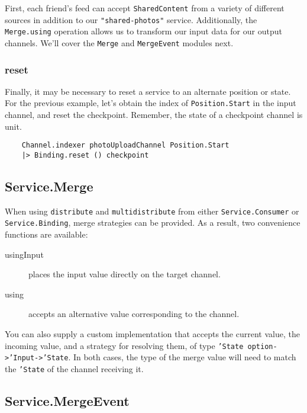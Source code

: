 \documentclass{article}
\begin{document}
First, each friend's feed can accept \texttt{SharedContent} from a variety of different sources in addition to our \texttt{"shared-photos"} service.  Additionally, the \texttt{Merge.using} operation allows us to transform our input data for our output channels.  We'll cover the \texttt{Merge} and \texttt{MergeEvent} modules next.

\subsubsection{reset}

Finally, it may be necessary to reset a service to an alternate position or state.  For the previous example, let's obtain the index of \texttt{Position.Start} in the input channel, and reset the checkpoint.  Remember, the state of a checkpoint channel is unit.

\begin{verbatim}
    Channel.indexer photoUploadChannel Position.Start
    |> Binding.reset () checkpoint  
\end{verbatim}

\subsection{Service.Merge}

When using \texttt{distribute} and \texttt{multidistribute} from either \texttt{Service.Consumer} or \texttt{Service.Binding}, merge strategies can be provided.  As a result, two convenience functions are available:

\begin{description}
    \item[usingInput] places the input value directly on the target channel.
    \item[using] accepts an alternative value corresponding to the channel.
\end{description}

You can also supply a custom implementation that accepts the current value, the incoming value, and a strategy for resolving them, of type \texttt{'State option->'Input->'State}.  In both cases, the type of the merge value will need to match the \texttt{'State} of the channel receiving it.

\subsection{Service.MergeEvent}
\end{document}
